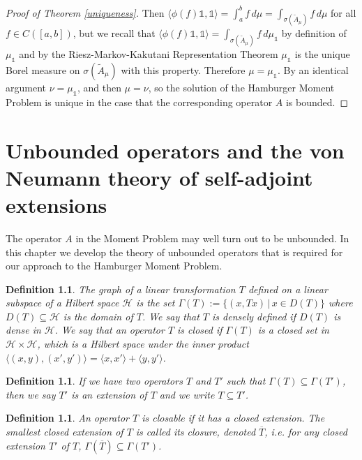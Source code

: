 \documentclass[12pt,oneside]{report}
\newtheorem{defn}[thm]{Definition}
\begin{document}
\begin{proof}[Proof of Theorem \ref{uniqueness}]
    Then $\langle \phi(f)\mathds{1}, \mathds{1} \rangle = \int _{a}^{b} f \, d\mu = \int _{\sigma(\tilde{A}_{\mu})} f \, d\mu$ for all $f \in C([a,b])$, but we recall that $\langle \phi(f)\mathds{1}, \mathds{1} \rangle = \int _{\sigma(\tilde{A}_{\mu})} f \, d\mu_{\mathds{1}}$ by definition of $\mu_{\mathds{1}}$ and by the Riesz-Markov-Kakutani Representation Theorem $\mu_{\mathds{1}}$ is the unique Borel measure on $\sigma(\tilde{A}_{\mu})$ with this property. Therefore $\mu = \mu_\mathds{1}$. By an identical argument $\nu = \mu_\mathds{1}$, and then $\mu = \nu$, so the solution of the Hamburger Moment Problem is unique in the case that the corresponding operator $A$ is bounded.
\end{proof}


\chapter{Unbounded operators and the von Neumann theory of self-adjoint extensions}\label{ch5}

The operator $A$ in the Moment Problem may well turn out to be unbounded. In this chapter we develop the theory of unbounded operators that is required for our approach to the Hamburger Moment Problem.

\begin{defn}
    The graph of a linear transformation $T$ defined on a linear subspace of a Hilbert space $\mathscr{H}$ is the set $\Gamma(T) := \{ (x, Tx) \, | \, x \in D(T) \}$ where $D(T) \subseteq \mathscr{H}$ is the domain of $T$. We say that $T$ is densely defined if $D(T)$ is dense in $\mathscr{H}$. We say that an operator $T$ is closed if $\Gamma(T)$ is a closed set in $\mathscr{H} \times \mathscr{H}$, which is a Hilbert space under the inner product $\langle (x,y), (x',y') \rangle = \langle x,x' \rangle + \langle y,y' \rangle$.
\end{defn}

\begin{defn}
    If we have two operators $T$ and $T'$ such that $\Gamma(T) \subseteq \Gamma(T')$, then we say $T'$ is an extension of $T$ and we write $T \subseteq T'$.
\end{defn}

\begin{defn}
    An operator $T$ is closable if it has a closed extension. The smallest closed extension of $T$ is called its closure, denoted $\overline{T}$, i.e. for any closed extension $T'$ of $T$, $\Gamma(\overline{T}) \subseteq \Gamma(T')$.
\end{defn}
\end{document}
